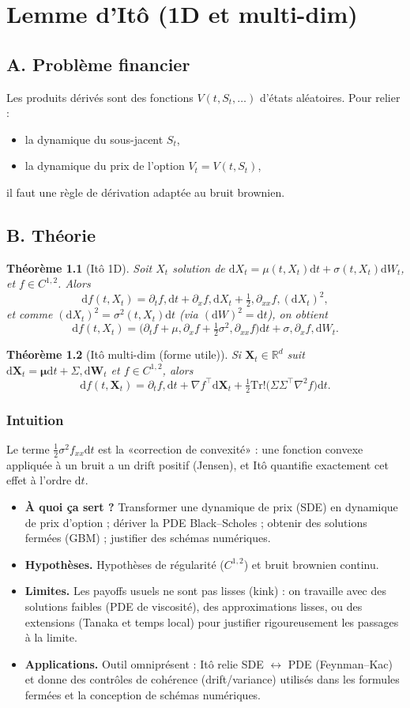 \documentclass[11pt,a4paper]{report}
\theoremstyle{definition}
\theoremstyle{plain}
\newtheorem{theorem}{Théorème}[chapter]
\theoremstyle{remark}
\newcommand{\dd}{\mathrm{d}}
\newcommand{\1}{\mathbf{1}}
\newcommand{\R}{\mathbb{R}}
\newcommand{\qa}[4]{
\begin{itemize}[leftmargin=*]
\item \textbf{À quoi ça sert ?} #1
\item \textbf{Hypothèses.} #2
\item \textbf{Limites.} #3
\item \textbf{Applications.} #4
\end{itemize}
}
\begin{document}
\chapter{Lemme d'Itô (1D et multi-dim)}

\section{A. Problème financier}
Les produits dérivés sont des fonctions $V(t,S_t,\ldots)$ d'états aléatoires. Pour relier :
\begin{itemize}[leftmargin=*]
\item la dynamique du sous-jacent $S_t$,
\item la dynamique du prix de l'option $V_t=V(t,S_t)$,
\end{itemize}
il faut une règle de dérivation adaptée au bruit brownien.

\section{B. Théorie}
\begin{theorem}[Itô 1D]
Soit $X_t$ solution de $\dd X_t=\mu(t,X_t)\dd t+\sigma(t,X_t)\dd W_t$, et $f\in C^{1,2}$. Alors
\[
\dd f(t,X_t)=\partial_t f,\dd t+\partial_x f,\dd X_t+\tfrac12,\partial_{xx}f,(\dd X_t)^2,
\]
et comme $(\dd X_t)^2=\sigma^2(t,X_t)\dd t$ (via $(\dd W)^2=\dd t$), on obtient
\[
\dd f(t,X_t)=\Big(\partial_t f+\mu,\partial_x f+\tfrac12\sigma^2,\partial_{xx}f\Big)\dd t+\sigma,\partial_x f,\dd W_t.
\]
\end{theorem}

\begin{theorem}[Itô multi-dim (forme utile)]
Si $\bm{X}_t\in\R^d$ suit $\dd \bm{X}_t=\bm{\mu}\dd t+\Sigma,\dd \bm{W}_t$ et $f\in C^{1,2}$, alors
\[
\dd f(t,\bm{X}_t)=\partial_t f,\dd t+\nabla f^\top \dd \bm{X}_t+\tfrac12 \mathrm{Tr}!\big(\Sigma\Sigma^\top \nabla^2 f\big)\dd t.
\]
\end{theorem}

\subsection*{Intuition}
Le terme $\tfrac12\sigma^2 f_{xx}\dd t$ est la «correction de convexité» : une fonction convexe appliquée à un bruit a un drift positif (Jensen), et Itô quantifie exactement cet effet à l'ordre $\dd t$.

\qa
{Transformer une dynamique de prix (SDE) en dynamique de prix d'option ; dériver la PDE Black--Scholes ; obtenir des solutions fermées (GBM) ; justifier des schémas numériques.}
{Hypothèses de régularité ($C^{1,2}$) et bruit brownien continu.}
{Les payoffs usuels ne sont pas lisses (kink) : on travaille avec des solutions faibles (PDE de viscosité), des approximations lisses, ou des extensions (Tanaka et temps local) pour justifier rigoureusement les passages à la limite.}
{Outil omniprésent : Itô relie SDE $\leftrightarrow$ PDE (Feynman--Kac) et donne des contrôles de cohérence (drift/variance) utilisés dans les formules fermées et la conception de schémas numériques.}
\end{document}
